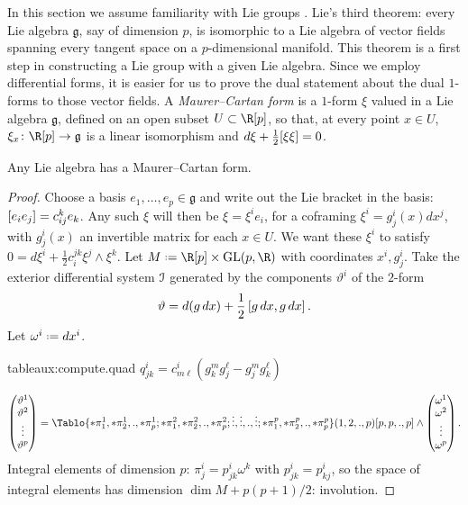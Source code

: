 %
In this section we assume familiarity with Lie groups \cite{Stillwell:2008}.
Lie's third theorem: every Lie algebra \(\mathfrak{g}\), say of dimension \(p\), is isomorphic to a Lie algebra of vector fields spanning every tangent space on a \(p\)-dimensional manifold.
This theorem is a first step in constructing a Lie group with a given Lie algebra.
Since we employ differential forms, it is easier for us to prove the dual statement about the dual \(1\)-forms to those vector fields.
A \emph{Maurer--Cartan form} is a \(1\)-form \(\xi\) valued in a Lie algebra \(\mathfrak{g}\), defined on an open subset \(U\subset\R[p]\), so that, at every point \(x\in U\), \(\xi_x \colon \R[p] \to \mathfrak{g}\) is a linear isomorphism and \(d\xi+\frac{1}{2}\lb{\xi}{\xi}=0\).
\begin{theorem}
Any Lie algebra has a Maurer--Cartan form.
\end{theorem}
\begin{proof}
Choose a basis \(e_1,\dots,e_p\in\mathfrak{g}\) and write out the Lie bracket in the basis: \(\lb{e_i}{e_j}=c^k_{ij}e_k\).
Any such \(\xi\) will then be \(\xi=\xi^ie_i\), for a coframing \(\xi^i=g^i_j(x)dx^j\), with \(g^i_j(x)\) an invertible matrix for each \(x\in U\).
We want these \(\xi^i\) to satisfy \(0=d\xi^i+\frac{1}{2}c_i^{jk} \xi^j\wedge\xi^k\).
Let \(M\defeq \R[p] \times \GL{p,\R}\) with coordinates \(x^i,g^i_j\).
Take the exterior differential system \(\mathcal{I}\) generated by the components \(\vartheta^i\) of the \(2\)-form
\[
\vartheta=d(g\, dx) + \frac{1}{2}\lb*{g \, dx}{g \, dx}.
\]
Let \(\omega^i\defeq dx^i\).
\begin{answer}{tableaux:compute.quad}
\(q^i_{jk} = c^i_{m\ell}(g^m_kg^{\ell}_j-g^m_jg^{\ell}_k)\)
\end{answer}
\[
\begin{pmatrix}
\vartheta^1\\
\vartheta^2\\
\vdots\\
\vartheta^p
\end{pmatrix}
=
\Tablo{%
*\pi^1_1,*\pi^1_2,.,*\pi^1_p;
*\pi^2_1,*\pi^2_2,.,*\pi^2_p;
\vdots,\vdots,.,\vdots;
*\pi^p_1,*\pi^p_2,.,*\pi^p_p}%
(1,2,.,p)[p,p,.,p]
\wedge
\begin{pmatrix}
\omega^1 \\
\omega^2 \\
\vdots\\
\omega^p
\end{pmatrix}.
\]
Integral elements of dimension \(p\): \(\pi^i_j=p^i_{jk}\omega^k\) with \(p^i_{jk}=p^i_{kj}\), so the space of integral elements has dimension \(\dim M+p(p+1)/2\): involution.
\end{proof}
